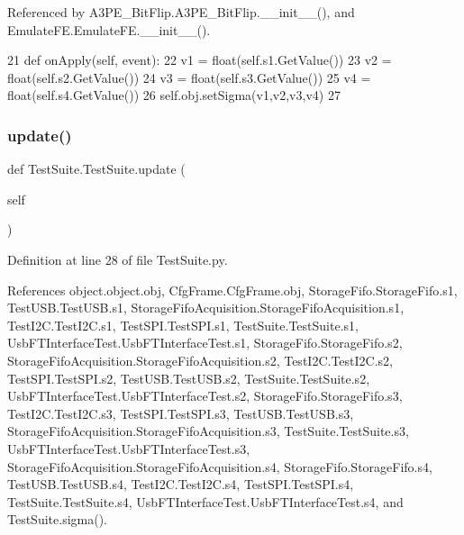 Referenced by A3\+P\+E\+\_\+\+Bit\+Flip.\+A3\+P\+E\+\_\+\+Bit\+Flip.\+\_\+\+\_\+init\+\_\+\+\_\+(), and Emulate\+F\+E.\+Emulate\+F\+E.\+\_\+\+\_\+init\+\_\+\+\_\+().


\begin{DoxyCode}
21     \textcolor{keyword}{def }onApply(self, event):
22         v1 = float(self.s1.GetValue())
23         v2 = float(self.s2.GetValue())
24         v3 = float(self.s3.GetValue())
25         v4 = float(self.s4.GetValue())
26         self.obj.setSigma(v1,v2,v3,v4)
27 
\end{DoxyCode}
\mbox{\label{classTestSuite_1_1TestSuite_aee5f1c66f7aa5189cd2ed3cf2fca93f5}} 
\subsubsection{\texorpdfstring{update()}{update()}}
{\footnotesize\ttfamily def Test\+Suite.\+Test\+Suite.\+update (\begin{DoxyParamCaption}\item[{}]{self }\end{DoxyParamCaption})}



Definition at line 28 of file Test\+Suite.\+py.



References object.\+object.\+obj, Cfg\+Frame.\+Cfg\+Frame.\+obj, Storage\+Fifo.\+Storage\+Fifo.\+s1, Test\+U\+S\+B.\+Test\+U\+S\+B.\+s1, Storage\+Fifo\+Acquisition.\+Storage\+Fifo\+Acquisition.\+s1, Test\+I2\+C.\+Test\+I2\+C.\+s1, Test\+S\+P\+I.\+Test\+S\+P\+I.\+s1, Test\+Suite.\+Test\+Suite.\+s1, Usb\+F\+T\+Interface\+Test.\+Usb\+F\+T\+Interface\+Test.\+s1, Storage\+Fifo.\+Storage\+Fifo.\+s2, Storage\+Fifo\+Acquisition.\+Storage\+Fifo\+Acquisition.\+s2, Test\+I2\+C.\+Test\+I2\+C.\+s2, Test\+S\+P\+I.\+Test\+S\+P\+I.\+s2, Test\+U\+S\+B.\+Test\+U\+S\+B.\+s2, Test\+Suite.\+Test\+Suite.\+s2, Usb\+F\+T\+Interface\+Test.\+Usb\+F\+T\+Interface\+Test.\+s2, Storage\+Fifo.\+Storage\+Fifo.\+s3, Test\+I2\+C.\+Test\+I2\+C.\+s3, Test\+S\+P\+I.\+Test\+S\+P\+I.\+s3, Test\+U\+S\+B.\+Test\+U\+S\+B.\+s3, Storage\+Fifo\+Acquisition.\+Storage\+Fifo\+Acquisition.\+s3, Test\+Suite.\+Test\+Suite.\+s3, Usb\+F\+T\+Interface\+Test.\+Usb\+F\+T\+Interface\+Test.\+s3, Storage\+Fifo\+Acquisition.\+Storage\+Fifo\+Acquisition.\+s4, Storage\+Fifo.\+Storage\+Fifo.\+s4, Test\+U\+S\+B.\+Test\+U\+S\+B.\+s4, Test\+I2\+C.\+Test\+I2\+C.\+s4, Test\+S\+P\+I.\+Test\+S\+P\+I.\+s4, Test\+Suite.\+Test\+Suite.\+s4, Usb\+F\+T\+Interface\+Test.\+Usb\+F\+T\+Interface\+Test.\+s4, and Test\+Suite.\+sigma().




